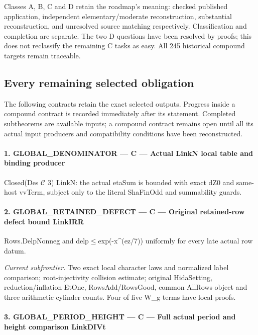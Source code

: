 \documentclass[11pt,a4paper]{article}
\numberwithin{equation}{section}
\theoremstyle{remark}\newtheorem{remark}[theorem]{Remark}
\begin{document}
Classes A, B, C and D retain the roadmap's meaning: checked published
application, independent elementary/moderate reconstruction, substantial
reconstruction, and unresolved source matching respectively.
Classification and completion are separate. The two D questions have
been resolved by proofs; this does not reclassify the remaining C tasks
as easy. All 245 historical compound targets remain traceable.

\subsection{Every remaining selected obligation}

The following contracts retain the exact selected outputs. Progress
inside a compound contract is recorded immediately after its statement.
Completed subtheorems are available inputs; a compound contract remains
open until all its actual input producers and compatibility conditions
have been reconstructed.
\paragraph{1. GLOBAL\_\allowbreak{}DENOMINATOR — C — Actual LinkN local table and binding producer}

Closed(Des $\mathcal C$ 3) LinkN: the actual etaSum is bounded with exact dZ0 and same-host vvTerm, subject only to the literal ShaFinOdd and summability guards.


\paragraph{2. GLOBAL\_\allowbreak{}RETAINED\_\allowbreak{}DEFECT — C — Original retained-row defect bound LinkIRR}

Rows.DelpNonneg and delp$\le$exp(-x\textasciicircum{}(ez/\allowbreak{}7)) uniformly for every late actual row datum.


\emph{Current subfrontier.} Two exact local character laws and normalized label comparison; root-injectivity collision estimate; original HidaSetting, reduction/inflation EtOne, RowsAdd/RowsGood, common AllRows object and three arithmetic cylinder counts. Four of five W\_\allowbreak g terms have local proofs.


\paragraph{3. GLOBAL\_\allowbreak{}PERIOD\_\allowbreak{}HEIGHT — C — Full actual period and height comparison LinkDIVt}
\end{document}
